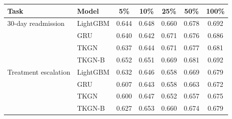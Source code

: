 \begin{tabular}{@{}llccccc@{}}
\toprule
Task & Model & 5\% & 10\% & 25\% & 50\% & 100\% \\
\midrule
30-day readmission & LightGBM & 0.644 & 0.648 & 0.660 & 0.678 & 0.692 \\
 & GRU & 0.640 & 0.642 & 0.671 & 0.676 & 0.686 \\
 & TKGN & 0.637 & 0.644 & 0.671 & 0.677 & 0.681 \\
 & TKGN-B & 0.652 & 0.651 & 0.669 & 0.681 & 0.692 \\
\midrule
Treatment escalation & LightGBM & 0.632 & 0.646 & 0.658 & 0.669 & 0.679 \\
 & GRU & 0.607 & 0.643 & 0.658 & 0.663 & 0.672 \\
 & TKGN & 0.600 & 0.647 & 0.652 & 0.657 & 0.675 \\
 & TKGN-B & 0.627 & 0.653 & 0.660 & 0.674 & 0.679 \\
\bottomrule
\end{tabular}
